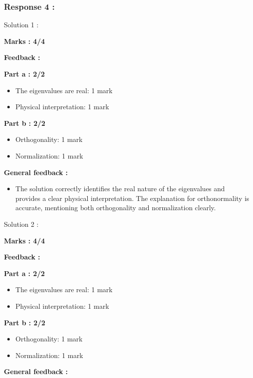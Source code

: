 \documentclass[a4paper,11pt]{article}
\begin{document}
\subsubsection*{Response 4 :}

Solution 1 : 

\textbf{Marks : 4/4}

\textbf{Feedback : }

\textbf{Part a : 2/2}

\begin{itemize}
    \item The eigenvalues are real: 1 mark
    \item Physical interpretation: 1 mark
\end{itemize}


\textbf{Part b : 2/2}

\begin{itemize}
    \item Orthogonality: 1 mark
    \item Normalization: 1 mark
\end{itemize}


\textbf{General feedback :}

\begin{itemize}
    \item The solution correctly identifies the real nature of the eigenvalues and provides a clear physical interpretation. The explanation for orthonormality is accurate, mentioning both orthogonality and normalization clearly.
\end{itemize}


Solution 2 : 

\textbf{Marks : 4/4}

\textbf{Feedback : }

\textbf{Part a : 2/2}

\begin{itemize}
    \item The eigenvalues are real: 1 mark
    \item Physical interpretation: 1 mark
\end{itemize}


\textbf{Part b : 2/2}

\begin{itemize}
    \item Orthogonality: 1 mark
    \item Normalization: 1 mark
\end{itemize}


\textbf{General feedback :}
\end{document}
